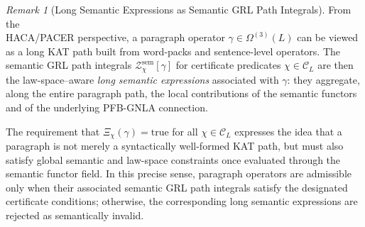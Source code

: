 \documentclass[11pt]{book}
\theoremstyle{plain}
\theoremstyle{definition}
\theoremstyle{remark}
\newtheorem{remark}[theorem]{Remark}
\begin{document}
\begin{remark}[Long Semantic Expressions as Semantic GRL Path Integrals]
\label{rem:long-semantic-expression-as-grl-pi}
From the \\HACA/PACER perspective, a paragraph operator
$\gamma\in\Omega^{(3)}(L)$ can be viewed as a long KAT path built
from word-packs and sentence-level operators. The semantic GRL
path integrals $\mathcal{Z}^{\mathrm{sem}}_\chi[\gamma]$ for
certificate predicates $\chi\in\mathcal{C}_L$ are then the
law-space–aware \emph{long semantic expressions} associated with
$\gamma$: they aggregate, along the entire paragraph path, the local
contributions of the semantic functors and of the underlying
PFB-GNLA connection.

The requirement that $\Xi_\chi(\gamma)=\mathrm{true}$ for all
$\chi\in\mathcal{C}_L$ expresses the idea that a paragraph is not
merely a syntactically well-formed KAT path, but must also satisfy
global semantic and law-space constraints once evaluated through the
semantic functor field. In this precise sense, paragraph operators
are admissible only when their associated semantic GRL path integrals
satisfy the designated certificate conditions; otherwise, the
corresponding long semantic expressions are rejected as semantically
invalid.

\end{remark}
\end{document}
